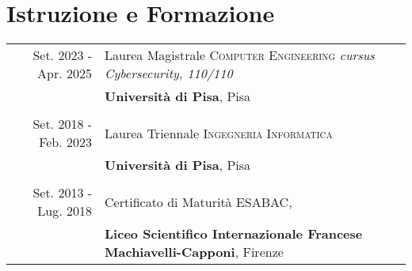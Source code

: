 \documentclass[a4paper,11pt]{article} %
\begin{document}
\begin{tabular}{r|p{12cm}}
%
%
%
%
\end{tabular}



\section{Istruzione e Formazione}

\begin{tabular}{rl}	



Set. 2023 - Apr. 2025 & Laurea Magistrale \textsc{Computer Engineering} \small\emph{cursus Cybersecurity, 110/110}\\
& \textbf{Università di Pisa}, Pisa\\
&\\


Set. 2018 - Feb. 2023 & Laurea Triennale \textsc{Ingegneria Informatica}\\%
&\textbf{Università di Pisa}, Pisa\\
&\\


Set. 2013 - Lug. 2018 & Certificato di Maturità \textsc{ESABAC},\\
&\textbf{Liceo Scientifico Internazionale Francese Machiavelli-Capponi}, Firenze
\end{tabular}
\end{document}
